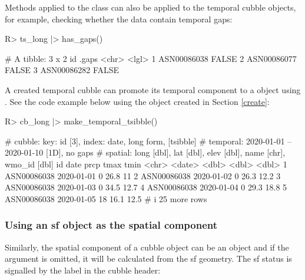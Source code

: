 \documentclass[
  shortnames]{jss}
\begin{document}
Methods applied to the  class can also be applied to the temporal cubble objects, for example, checking whether the data contain temporal gaps:

\begin{CodeChunk}
\begin{CodeInput}
R> ts_long |> has_gaps()
\end{CodeInput}
\begin{CodeOutput}
# A tibble: 3 x 2
  id          .gaps
  <chr>       <lgl>
1 ASN00086038 FALSE
2 ASN00086077 FALSE
3 ASN00086282 FALSE
\end{CodeOutput}
\end{CodeChunk}

A created temporal cubble can promote its temporal component to a  object using . See the code example below using the  object created in Section \ref{create}:

\begin{CodeChunk}
\begin{CodeInput}
R> cb_long |> make_temporal_tsibble() 
\end{CodeInput}
\begin{CodeOutput}
# cubble:   key: id [3], index: date, long form, [tsibble]
# temporal: 2020-01-01 -- 2020-01-10 [1D], no gaps
# spatial:  long [dbl], lat [dbl], elev [dbl], name [chr], wmo_id [dbl]
  id          date        prcp  tmax  tmin
  <chr>       <date>     <dbl> <dbl> <dbl>
1 ASN00086038 2020-01-01     0  26.8  11  
2 ASN00086038 2020-01-02     0  26.3  12.2
3 ASN00086038 2020-01-03     0  34.5  12.7
4 ASN00086038 2020-01-04     0  29.3  18.8
5 ASN00086038 2020-01-05    18  16.1  12.5
# i 25 more rows
\end{CodeOutput}
\end{CodeChunk}

\hypertarget{using-an-sf-object-as-the-spatial-component}{%
\subsubsection{Using an sf object as the spatial component}\label{using-an-sf-object-as-the-spatial-component}}

Similarly, the spatial component of a cubble object can be an  object and if the  argument is omitted, it will be calculated from the sf geometry. The sf status is signalled by the \code{[sf]} label in the cubble header:
\end{document}
